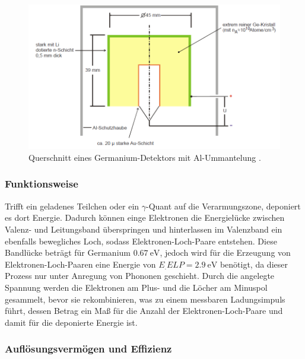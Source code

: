 \begin{figure}
	\centering
	\includegraphics[width=\linewidth-50pt,height=\textheight-50pt,keepaspectratio]{content/images/Detektor.pdf}
	\caption{Querschnitt eines Germanium-Detektors mit Al-Ummantelung \cite{V18}.}
	\label{fig:Det}
\end{figure}

\subsubsection{Funktionsweise}

Trifft ein geladenes Teilchen oder ein $\gamma$-Quant auf die Verarmungszone, deponiert es dort Energie. Dadurch können einge Elektronen die Energielücke zwischen Valenz- und Leitungsband überspringen und hinterlassen im Valenzband ein ebenfalls bewegliches Loch, sodass Elektronen-Loch-Paare entstehen. Diese Bandlücke beträgt für Germanium $\SI{0,67}{\electronvolt}$, jedoch wird für die Erzeugung von Elektronen-Loch-Paaren eine Energie von $E_.{ELP}=\SI{2,9}{\electronvolt}$\cite{V18} benötigt, da dieser Prozess nur unter Anregung von Phononen geschieht. Durch die angelegte Spannung werden die Elektronen am Plus- und die Löcher am Minuspol gesammelt, bevor sie rekombinieren, was zu einem messbaren Ladungsimpuls führt, dessen Betrag ein Maß für die Anzahl der Elektronen-Loch-Paare und damit für die deponierte Energie ist.

\subsubsection{Auflösungsvermögen und Effizienz}
\label{subsubsec:Effizienz}

